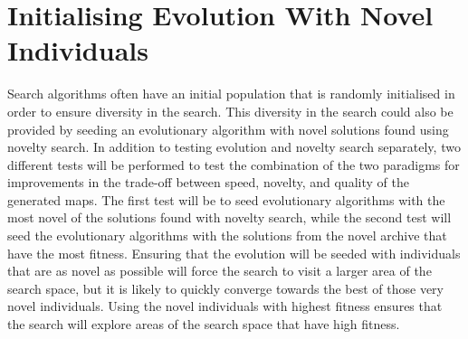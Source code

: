\section{Initialising Evolution With Novel Individuals}
\label{methodology_evolutionnovelseeds}
Search algorithms often have an initial population that is randomly initialised in order to ensure diversity in the search. This diversity in the search could also be provided by seeding an evolutionary algorithm with novel solutions found using novelty search. In addition to testing evolution and novelty search separately, two different tests will be performed to test the combination of the two paradigms for improvements in the trade-off between speed, novelty, and quality of the generated maps. The first test will be to seed evolutionary algorithms with the most novel of the solutions found with novelty search, while the second test will seed the evolutionary algorithms with the solutions from the novel archive that have the most fitness. Ensuring that the evolution will be seeded with individuals that are as novel as possible will force the search to visit a larger area of the search space, but it is likely to quickly converge towards the best of those very novel individuals. Using the novel individuals with highest fitness ensures that the search will explore areas of the search space that have high fitness.
